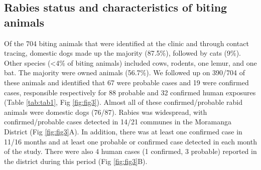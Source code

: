\documentclass[
  oneside]{book}
\begin{document}
\hypertarget{rabies-status-and-characteristics-of-biting-animals}{%
\subsection{Rabies status and characteristics of biting animals}\label{rabies-status-and-characteristics-of-biting-animals}}

Of the 704 biting animals that were identified at the clinic and through contact tracing, domestic dogs made up the majority (87.5\%), followed by cats (9\%). Other species (\textless4\% of biting animals) included cows, rodents, one lemur, and one bat. The majority were owned animals (56.7\%). We followed up on 390/704 of these animals and identified that 67 were probable cases and 19 were confirmed cases, responsible respectively for 88 probable and 32 confirmed human exposures (Table \ref{tab:tab1}, Fig \ref{fig:fig3}). Almost all of these confirmed/probable rabid animals were domestic dogs (76/87). Rabies was widespread, with confirmed/probable cases detected in 14/21 communes in the Moramanga District (Fig \ref{fig:fig3}A). In addition, there was at least one confirmed case in 11/16 months and at least one probable or confirmed case detected in each month of the study. There were also 4 human cases (1 confirmed, 3 probable) reported in the district during this period (Fig \ref{fig:fig3}B).
\end{document}
